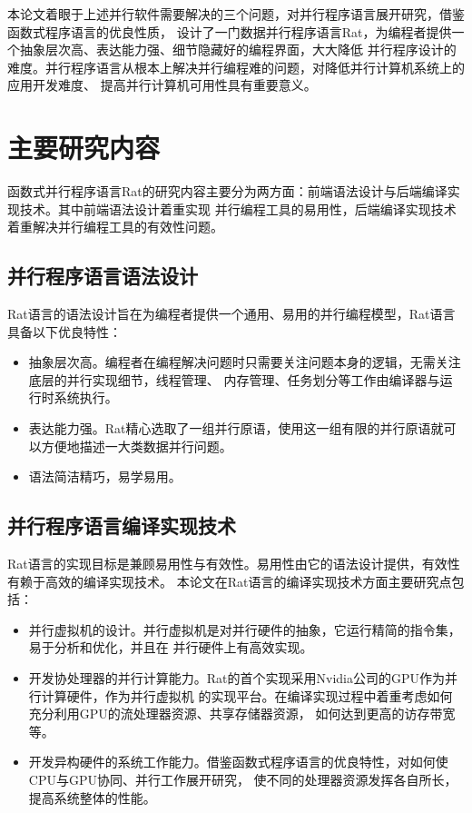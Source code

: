本论文着眼于上述并行软件需要解决的三个问题，对并行程序语言展开研究，借鉴函数式程序语言的优良性质，
设计了一门数据并行程序语言Rat，为编程者提供一个抽象层次高、表达能力强、细节隐藏好的编程界面，大大降低
并行程序设计的难度。并行程序语言从根本上解决并行编程难的问题，对降低并行计算机系统上的应用开发难度、
提高并行计算机可用性具有重要意义。


\section{主要研究内容}
函数式并行程序语言Rat的研究内容主要分为两方面：前端语法设计与后端编译实现技术。其中前端语法设计着重实现
并行编程工具的易用性，后端编译实现技术着重解决并行编程工具的有效性问题。

\subsection{并行程序语言语法设计}
Rat语言的语法设计旨在为编程者提供一个通用、易用的并行编程模型，Rat语言具备以下优良特性：
\begin{itemize}
  \item 抽象层次高。编程者在编程解决问题时只需要关注问题本身的逻辑，无需关注底层的并行实现细节，线程管理、
    内存管理、任务划分等工作由编译器与运行时系统执行。
  \item 表达能力强。Rat精心选取了一组并行原语，使用这一组有限的并行原语就可以方便地描述一大类数据并行问题。
  \item 语法简洁精巧，易学易用。
\end{itemize}

\subsection{并行程序语言编译实现技术}
Rat语言的实现目标是兼顾易用性与有效性。易用性由它的语法设计提供，有效性有赖于高效的编译实现技术。
本论文在Rat语言的编译实现技术方面主要研究点包括：
\begin{itemize}
  \item 并行虚拟机的设计。并行虚拟机是对并行硬件的抽象，它运行精简的指令集，易于分析和优化，并且在
    并行硬件上有高效实现。
  \item 开发协处理器的并行计算能力。Rat的首个实现采用Nvidia公司的GPU作为并行计算硬件，作为并行虚拟机
    的实现平台。在编译实现过程中着重考虑如何充分利用GPU的流处理器资源、共享存储器资源，
    如何达到更高的访存带宽等。
  \item 开发异构硬件的系统工作能力。借鉴函数式程序语言的优良特性，对如何使CPU与GPU协同、并行工作展开研究，
    使不同的处理器资源发挥各自所长，提高系统整体的性能。
\end{itemize}

